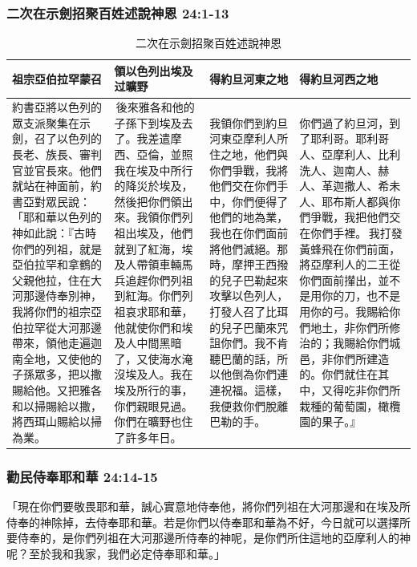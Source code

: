 \subsubsection{二次在示劍招聚百姓述說神恩 24:1-13}
\begin{table}[H]
\centering
\begin{tabular}{p{4.5cm}|p{}|p{3.5cm}|p{4.5cm}}\hline\hline
祖宗亞伯拉罕蒙召&領以色列出埃及过曠野&得約旦河東之地&得約旦河西之地\\\hline
約書亞將以色列的眾支派聚集在示劍，召了以色列的長老、族長、審判官並官長來。他們就站在神面前，約書亞對眾民說：「耶和華以色列的神如此說：『古時你們的列祖，就是亞伯拉罕和拿鶴的父親他拉，住在大河那邊侍奉別神，我將你們的祖宗亞伯拉罕從大河那邊帶來，領他走遍迦南全地，又使他的子孫眾多，把以撒賜給他。又把雅各和以掃賜給以撒，將西珥山賜給以掃為業。 &
 後來雅各和他的子孫下到埃及去了。我差遣摩西、亞倫，並照我在埃及中所行的降災於埃及，然後把你們領出來。我領你們列祖出埃及，他們就到了紅海，埃及人帶領車輛馬兵追趕你們列祖到紅海。你們列祖哀求耶和華，他就使你們和埃及人中間黑暗了，又使海水淹沒埃及人。我在埃及所行的事，你們親眼見過。你們在曠野也住了許多年日。
&我領你們到約旦河東亞摩利人所住之地，他們與你們爭戰，我將他們交在你們手中，你們便得了他們的地為業，我也在你們面前將他們滅絕。那時，摩押王西撥的兒子巴勒起來攻擊以色列人，打發人召了比珥的兒子巴蘭來咒詛你們。我不肯聽巴蘭的話，所以他倒為你們連連祝福。這樣，我便救你們脫離巴勒的手。
&你們過了約旦河，到了耶利哥。耶利哥人、亞摩利人、比利洗人、迦南人、赫人、革迦撒人、希未人、耶布斯人都與你們爭戰，我把他們交在你們手裡。 我打發黃蜂飛在你們前面，將亞摩利人的二王從你們面前攆出，並不是用你的刀，也不是用你的弓。我賜給你們地土，非你們所修治的；我賜給你們城邑，非你們所建造的。你們就住在其中，又得吃非你們所栽種的葡萄園，橄欖園的果子。』\\\hline
 \end{tabular}
\caption{二次在示劍招聚百姓述說神恩}
\end{table}


\subsubsection{勸民侍奉耶和華 24:14-15}
「現在你們要敬畏耶和華，誠心實意地侍奉他，將你們列祖在大河那邊和在埃及所侍奉的神除掉，去侍奉耶和華。若是你們以侍奉耶和華為不好，今日就可以選擇所要侍奉的，是你們列祖在大河那邊所侍奉的神呢，是你們所住這地的亞摩利人的神呢？至於我和我家，我們必定侍奉耶和華。」

